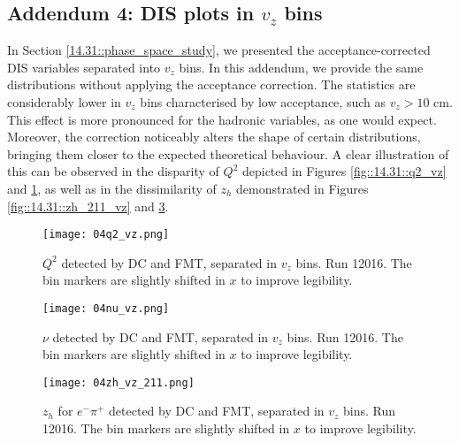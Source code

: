 \subsection*{Addendum 4: DIS plots in $v_z$ bins}
\label{20.04::dis_vz_plots}
    In Section \ref{14.31::phase_space_study}, we presented the acceptance-corrected DIS variables separated into $v_z$ bins.
    In this addendum, we provide the same distributions without applying the acceptance correction.
    The statistics are considerably lower in $v_z$ bins characterised by low acceptance, such as $v_z > 10$ cm.
    This effect is more pronounced for the hadronic variables, as one would expect.
    Moreover, the correction noticeably alters the shape of certain distributions, bringing them closer to the expected theoretical behaviour.
    A clear illustration of this can be observed in the disparity of $Q^2$ depicted in Figures \ref{fig::14.31::q2_vz} and \ref{fig::20.04::q2_vz}, as well as in the dissimilarity of $z_h$ demonstrated in Figures \ref{fig::14.31::zh_211_vz} and \ref{fig::20.04::zh_211_vz}.

    \begin{figure}
        \centering
        \texttt{[image: 04q2\_vz.png]}
        \caption[$Q^2$ separated in $v_z$ bins]
        {$Q^2$ detected by DC and FMT, separated in $v_z$ bins.
        Run 12016.
        The bin markers are slightly shifted in $x$ to improve legibility.}
        \label{fig::20.04::q2_vz}
    \end{figure}

    \begin{figure}
        \centering
        \texttt{[image: 04nu\_vz.png]}
        \caption[$\nu$ separated in $v_z$ bins]
        {$\nu$ detected by DC and FMT, separated in $v_z$ bins.
        Run 12016.
        The bin markers are slightly shifted in $x$ to improve legibility.}
        \label{fig::20.04::nu_vz}
    \end{figure}

    \begin{figure}
        \centering
        \texttt{[image: 04zh\_vz\_211.png]}
        \caption[$z_h$ for $e^-\pi^+$ separated in $v_z$ bins]
        {$z_h$ for $e^-\pi^+$ detected by DC and FMT, separated in $v_z$ bins.
        Run 12016.
        The bin markers are slightly shifted in $x$ to improve legibility.}
        \label{fig::20.04::zh_211_vz}
    \end{figure}

